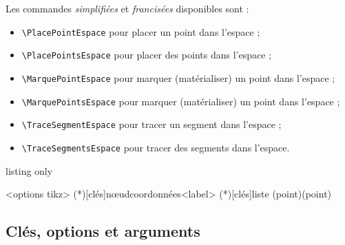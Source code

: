 \documentclass[french,a4paper,11pt]{article}
\begin{document}
\begin{cautionblock}
Les commandes \textit{simplifiées} et \textit{francisées} disponibles sont :

\begin{itemize}
	\item \texttt{\textbackslash PlacePointEspace} pour placer un point dans l'espace ;
	\item \texttt{\textbackslash PlacePointsEspace} pour placer des points dans l'espace ;
	\item \texttt{\textbackslash MarquePointEspace} pour marquer (matérialiser) un point dans l'espace ;
	\item \texttt{\textbackslash MarquePointsEspace} pour marquer (matérialiser) un point dans l'espace ;
	\item \texttt{\textbackslash TraceSegmentEspace} pour tracer un segment dans l'espace ;
	\item \texttt{\textbackslash TraceSegmentsEspace} pour tracer des segments dans l'espace.
\end{itemize}
\vspace*{-\baselineskip}\leavevmode
\end{cautionblock}

\begin{PresCodeTex}{listing only}
\begin{EnvTikzEspace}[Clés]<options tikz>
	\PlacePointEspace(*)[clés]{nœud}{coordonnées}<label>
	\PlacePointsEspace(*)[clés]{liste}
	\TraceSegmentEspace[clés](point)(point)
\end{EnvTikzEspace}
\end{PresCodeTex}

\subsection{Clés, options et arguments}
\end{document}

